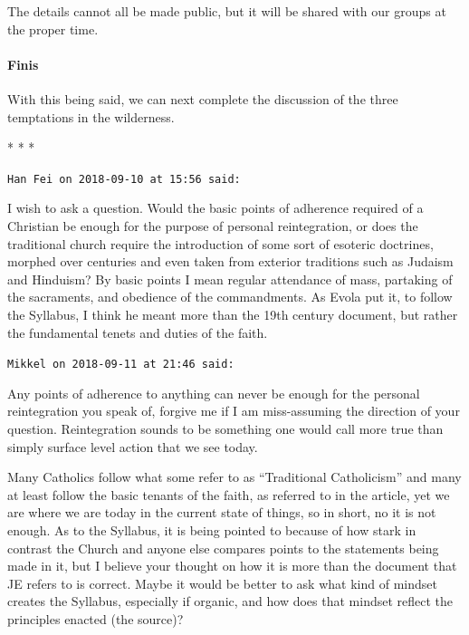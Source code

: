 The details cannot all be made public, but it will be shared with our groups at the proper time.

\paragraph{Finis}
With this being said, we can next complete the discussion of the three temptations in the wilderness.


\begin{center}* * *\end{center}

\begin{footnotesize}\begin{sffamily}
\texttt{Han Fei on 2018-09-10 at 15:56 said: }

I wish to ask a question. Would the basic points of adherence required of a Christian be enough for the purpose of
personal reintegration, or does the traditional church require the introduction of some sort of esoteric doctrines,
morphed over centuries and even taken from exterior traditions such as Judaism and Hinduism? By basic points I mean
regular attendance of mass, partaking of the sacraments, and obedience of the commandments. As Evola put it, to follow
the Syllabus, I think he meant more than the 19th century document, but rather the fundamental tenets and duties of the
faith.


\hfill

\texttt{Mikkel on 2018-09-11 at 21:46 said: }

Any points of adherence to anything can never be enough for the personal reintegration you speak of, forgive me if I am
miss-assuming the direction of your question. Reintegration sounds to be something one would call more true than simply
surface level action that we see today.

Many Catholics follow what some refer to as “Traditional Catholicism” and many at least follow the basic tenants of the
faith, as referred to in the article, yet we are where we are today in the current state of things, so in short, no it
is not enough. As to the Syllabus, it is being pointed to because of how stark in contrast the Church and anyone else
compares points to the statements being made in it, but I believe your thought on how it is more than the document that
JE refers to is correct. Maybe it would be better to ask what kind of mindset creates the Syllabus, especially if
organic, and how does that mindset reflect the principles enacted (the source)? 


\end{sffamily}
\end{footnotesize}
